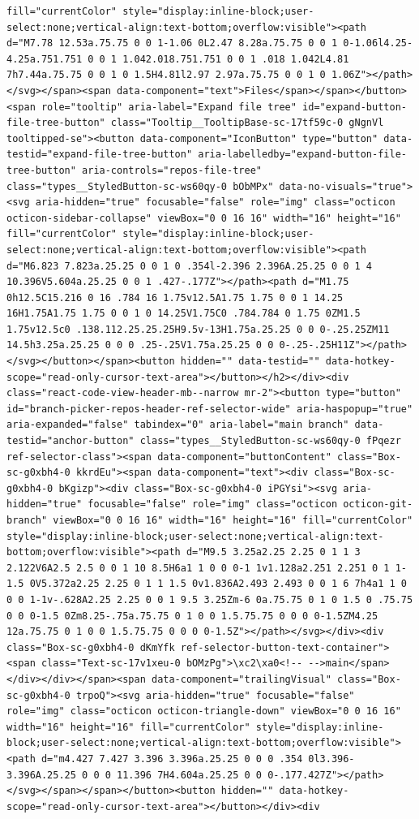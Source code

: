 \documentclass[
  letterpaper,
]{book}
\begin{document}
\begin{verbatim}
fill="currentColor" style="display:inline-block;user-select:none;vertical-align:text-bottom;overflow:visible"><path d="M7.78 12.53a.75.75 0 0 1-1.06 0L2.47 8.28a.75.75 0 0 1 0-1.06l4.25-4.25a.751.751 0 0 1 1.042.018.751.751 0 0 1 .018 1.042L4.81 7h7.44a.75.75 0 0 1 0 1.5H4.81l2.97 2.97a.75.75 0 0 1 0 1.06Z"></path></svg></span><span data-component="text">Files</span></span></button><span role="tooltip" aria-label="Expand file tree" id="expand-button-file-tree-button" class="Tooltip__TooltipBase-sc-17tf59c-0 gNgnVl tooltipped-se"><button data-component="IconButton" type="button" data-testid="expand-file-tree-button" aria-labelledby="expand-button-file-tree-button" aria-controls="repos-file-tree" class="types__StyledButton-sc-ws60qy-0 bObMPx" data-no-visuals="true"><svg aria-hidden="true" focusable="false" role="img" class="octicon octicon-sidebar-collapse" viewBox="0 0 16 16" width="16" height="16" fill="currentColor" style="display:inline-block;user-select:none;vertical-align:text-bottom;overflow:visible"><path d="M6.823 7.823a.25.25 0 0 1 0 .354l-2.396 2.396A.25.25 0 0 1 4 10.396V5.604a.25.25 0 0 1 .427-.177Z"></path><path d="M1.75 0h12.5C15.216 0 16 .784 16 1.75v12.5A1.75 1.75 0 0 1 14.25 16H1.75A1.75 1.75 0 0 1 0 14.25V1.75C0 .784.784 0 1.75 0ZM1.5 1.75v12.5c0 .138.112.25.25.25H9.5v-13H1.75a.25.25 0 0 0-.25.25ZM11 14.5h3.25a.25.25 0 0 0 .25-.25V1.75a.25.25 0 0 0-.25-.25H11Z"></path></svg></button></span><button hidden="" data-testid="" data-hotkey-scope="read-only-cursor-text-area"></button></h2></div><div class="react-code-view-header-mb--narrow mr-2"><button type="button" id="branch-picker-repos-header-ref-selector-wide" aria-haspopup="true" aria-expanded="false" tabindex="0" aria-label="main branch" data-testid="anchor-button" class="types__StyledButton-sc-ws60qy-0 fPqezr ref-selector-class"><span data-component="buttonContent" class="Box-sc-g0xbh4-0 kkrdEu"><span data-component="text"><div class="Box-sc-g0xbh4-0 bKgizp"><div class="Box-sc-g0xbh4-0 iPGYsi"><svg aria-hidden="true" focusable="false" role="img" class="octicon octicon-git-branch" viewBox="0 0 16 16" width="16" height="16" fill="currentColor" style="display:inline-block;user-select:none;vertical-align:text-bottom;overflow:visible"><path d="M9.5 3.25a2.25 2.25 0 1 1 3 2.122V6A2.5 2.5 0 0 1 10 8.5H6a1 1 0 0 0-1 1v1.128a2.251 2.251 0 1 1-1.5 0V5.372a2.25 2.25 0 1 1 1.5 0v1.836A2.493 2.493 0 0 1 6 7h4a1 1 0 0 0 1-1v-.628A2.25 2.25 0 0 1 9.5 3.25Zm-6 0a.75.75 0 1 0 1.5 0 .75.75 0 0 0-1.5 0Zm8.25-.75a.75.75 0 1 0 0 1.5.75.75 0 0 0 0-1.5ZM4.25 12a.75.75 0 1 0 0 1.5.75.75 0 0 0 0-1.5Z"></path></svg></div><div class="Box-sc-g0xbh4-0 dKmYfk ref-selector-button-text-container"><span class="Text-sc-17v1xeu-0 bOMzPg">\xc2\xa0<!-- -->main</span></div></div></span><span data-component="trailingVisual" class="Box-sc-g0xbh4-0 trpoQ"><svg aria-hidden="true" focusable="false" role="img" class="octicon octicon-triangle-down" viewBox="0 0 16 16" width="16" height="16" fill="currentColor" style="display:inline-block;user-select:none;vertical-align:text-bottom;overflow:visible"><path d="m4.427 7.427 3.396 3.396a.25.25 0 0 0 .354 0l3.396-3.396A.25.25 0 0 0 11.396 7H4.604a.25.25 0 0 0-.177.427Z"></path></svg></span></span></button><button hidden="" data-hotkey-scope="read-only-cursor-text-area"></button></div><div 
\end{verbatim}
\end{document}
